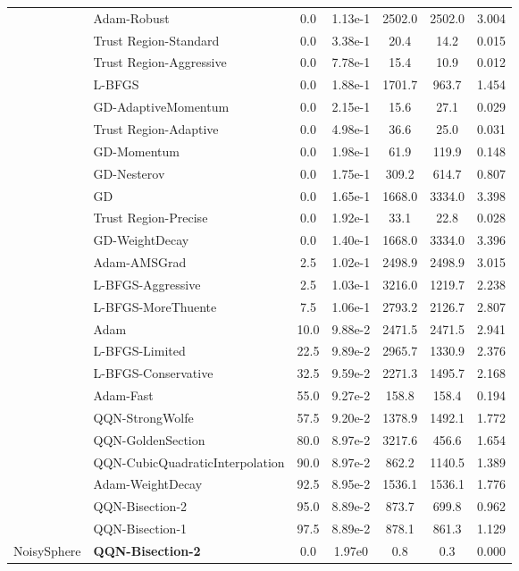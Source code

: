 \documentclass{article}
\begin{document}
\begin{table}[htbp]
{\begin{tabular}{p{2.5cm}p{2.5cm}*{5}{c}}
 & Adam-Robust & 0.0 & 1.13e-1 & 2502.0 & 2502.0 & 3.004 \\
 & Trust Region-Standard & 0.0 & 3.38e-1 & 20.4 & 14.2 & 0.015 \\
 & Trust Region-Aggressive & 0.0 & 7.78e-1 & 15.4 & 10.9 & 0.012 \\
 & L-BFGS & 0.0 & 1.88e-1 & 1701.7 & 963.7 & 1.454 \\
 & GD-AdaptiveMomentum & 0.0 & 2.15e-1 & 15.6 & 27.1 & 0.029 \\
 & Trust Region-Adaptive & 0.0 & 4.98e-1 & 36.6 & 25.0 & 0.031 \\
 & GD-Momentum & 0.0 & 1.98e-1 & 61.9 & 119.9 & 0.148 \\
 & GD-Nesterov & 0.0 & 1.75e-1 & 309.2 & 614.7 & 0.807 \\
 & GD & 0.0 & 1.65e-1 & 1668.0 & 3334.0 & 3.398 \\
 & Trust Region-Precise & 0.0 & 1.92e-1 & 33.1 & 22.8 & 0.028 \\
 & GD-WeightDecay & 0.0 & 1.40e-1 & 1668.0 & 3334.0 & 3.396 \\
 & Adam-AMSGrad & 2.5 & 1.02e-1 & 2498.9 & 2498.9 & 3.015 \\
 & L-BFGS-Aggressive & 2.5 & 1.03e-1 & 3216.0 & 1219.7 & 2.238 \\
 & L-BFGS-MoreThuente & 7.5 & 1.06e-1 & 2793.2 & 2126.7 & 2.807 \\
 & Adam & 10.0 & 9.88e-2 & 2471.5 & 2471.5 & 2.941 \\
 & L-BFGS-Limited & 22.5 & 9.89e-2 & 2965.7 & 1330.9 & 2.376 \\
 & L-BFGS-Conservative & 32.5 & 9.59e-2 & 2271.3 & 1495.7 & 2.168 \\
 & Adam-Fast & 55.0 & 9.27e-2 & 158.8 & 158.4 & 0.194 \\
 & QQN-StrongWolfe & 57.5 & 9.20e-2 & 1378.9 & 1492.1 & 1.772 \\
 & QQN-GoldenSection & 80.0 & 8.97e-2 & 3217.6 & 456.6 & 1.654 \\
 & QQN-CubicQuadraticInterpolation & 90.0 & 8.97e-2 & 862.2 & 1140.5 & 1.389 \\
 & Adam-WeightDecay & 92.5 & 8.95e-2 & 1536.1 & 1536.1 & 1.776 \\
 & QQN-Bisection-2 & 95.0 & 8.89e-2 & 873.7 & 699.8 & 0.962 \\
 & QQN-Bisection-1 & 97.5 & 8.89e-2 & 878.1 & 861.3 & 1.129 \\
\midrule
\multirow{25}{*}{NoisySphere} & \textbf{QQN-Bisection-2} & 0.0 & 1.97e0 & 0.8 & 0.3 & 0.000 \\

\end{tabular}}
\end{table}
\end{document}
